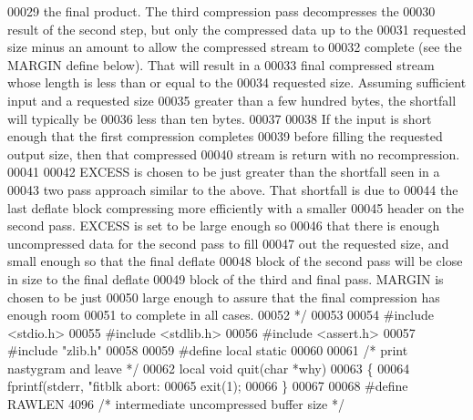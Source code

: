 \begin{DoxyCode}
00029 \textcolor{comment}{   the final product.  The third compression pass decompresses the}
00030 \textcolor{comment}{   result of the second step, but only the compressed data up to the}
00031 \textcolor{comment}{   requested size minus an amount to allow the compressed stream to}
00032 \textcolor{comment}{   complete (see the MARGIN define below).  That will result in a}
00033 \textcolor{comment}{   final compressed stream whose length is less than or equal to the}
00034 \textcolor{comment}{   requested size.  Assuming sufficient input and a requested size}
00035 \textcolor{comment}{   greater than a few hundred bytes, the shortfall will typically be}
00036 \textcolor{comment}{   less than ten bytes.}
00037 \textcolor{comment}{}
00038 \textcolor{comment}{   If the input is short enough that the first compression completes}
00039 \textcolor{comment}{   before filling the requested output size, then that compressed}
00040 \textcolor{comment}{   stream is return with no recompression.}
00041 \textcolor{comment}{}
00042 \textcolor{comment}{   EXCESS is chosen to be just greater than the shortfall seen in a}
00043 \textcolor{comment}{   two pass approach similar to the above.  That shortfall is due to}
00044 \textcolor{comment}{   the last deflate block compressing more efficiently with a smaller}
00045 \textcolor{comment}{   header on the second pass.  EXCESS is set to be large enough so}
00046 \textcolor{comment}{   that there is enough uncompressed data for the second pass to fill}
00047 \textcolor{comment}{   out the requested size, and small enough so that the final deflate}
00048 \textcolor{comment}{   block of the second pass will be close in size to the final deflate}
00049 \textcolor{comment}{   block of the third and final pass.  MARGIN is chosen to be just}
00050 \textcolor{comment}{   large enough to assure that the final compression has enough room}
00051 \textcolor{comment}{   to complete in all cases.}
00052 \textcolor{comment}{ */}
00053 
00054 \textcolor{preprocessor}{#include <stdio.h>}
00055 \textcolor{preprocessor}{#include <stdlib.h>}
00056 \textcolor{preprocessor}{#include <assert.h>}
00057 \textcolor{preprocessor}{#include "zlib.h"}
00058 
00059 \textcolor{preprocessor}{#define local static}
00060 
00061 \textcolor{comment}{/* print nastygram and leave */}
00062 local \textcolor{keywordtype}{void} quit(\textcolor{keywordtype}{char} *why)
00063 \{
00064     fprintf(stderr, \textcolor{stringliteral}{"fitblk abort: %
00065     exit(1);
00066 \}
00067 
00068 \textcolor{preprocessor}{#define RAWLEN 4096    }\textcolor{comment}{/* intermediate uncompressed buffer size */}\textcolor{preprocessor}{}
}
\end{DoxyCode}
